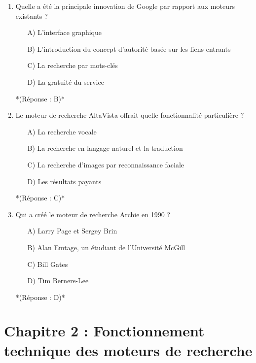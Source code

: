 \documentclass[12pt,a4paper,twoside]{report}
\begin{document}
\begin{enumerate}
\item Quelle a été la principale innovation de Google par rapport aux moteurs existants ?
\begin{itemize}
\item[A)] L'interface graphique
\item[B)] L'introduction du concept d'autorité basée sur les liens entrants
\item[C)] La recherche par mots-clés
\item[D)] La gratuité du service
\end{itemize}
*(Réponse : B)*

\item Le moteur de recherche AltaVista offrait quelle fonctionnalité particulière ?
\begin{itemize}
\item[A)] La recherche vocale
\item[B)] La recherche en langage naturel et la traduction
\item[C)] La recherche d'images par reconnaissance faciale
\item[D)] Les résultats payants
\end{itemize}
*(Réponse : C)*

\item Qui a créé le moteur de recherche Archie en 1990 ?
\begin{itemize}
\item[A)] Larry Page et Sergey Brin
\item[B)] Alan Emtage, un étudiant de l'Université McGill
\item[C)] Bill Gates
\item[D)] Tim Berners-Lee
\end{itemize}
*(Réponse : D)*
\end{enumerate}

\newpage

\section*{Chapitre 2 : Fonctionnement technique des moteurs de recherche}
\end{document}
